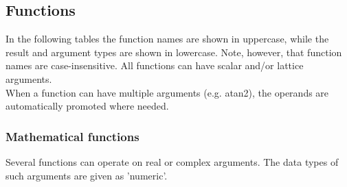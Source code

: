 \subsection{\label{LEL:FUNCTIONS}Functions}
In the following tables the function names are shown in uppercase,
while the result and argument types are shown in lowercase.
Note, however, that function names are case-insensitive.
All functions can have scalar and/or lattice arguments.
\\When a function can have multiple arguments (e.g. atan2), the
operands are automatically promoted where needed.

\subsubsection{Mathematical functions}
Several functions can operate on real or complex arguments.
The data types of such arguments are given as 'numeric'.
